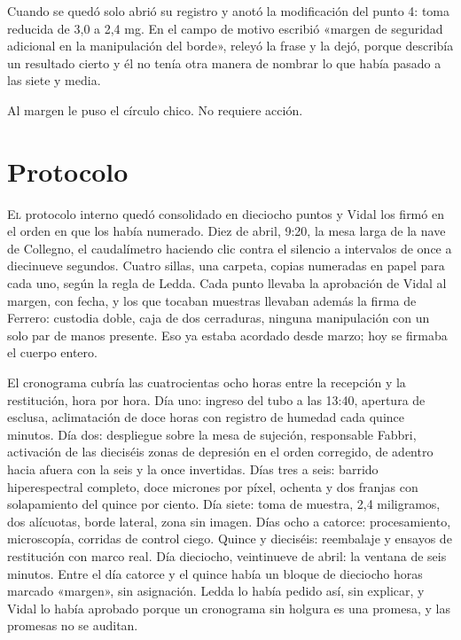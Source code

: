 Cuando se quedó solo abrió su registro y anotó la modificación del punto 4: toma reducida de 3,0 a 2,4 mg. En el campo de motivo escribió «margen de seguridad adicional en la manipulación del borde», releyó la frase y la dejó, porque describía un resultado cierto y él no tenía otra manera de nombrar lo que había pasado a las siete y media.

Al margen le puso el círculo chico. No requiere acción.

\clearpage

\chapter{Protocolo}

\lettrine[lines=2, lhang=0.1, nindent=0.2em]{E}{l} protocolo interno quedó consolidado en dieciocho puntos y Vidal los firmó en el orden en que los había numerado. Diez de abril, 9:20, la mesa larga de la nave de Collegno, el caudalímetro haciendo clic contra el silencio a intervalos de once a diecinueve segundos. Cuatro sillas, una carpeta, copias numeradas en papel para cada uno, según la regla de Ledda. Cada punto llevaba la aprobación de Vidal al margen, con fecha, y los que tocaban muestras llevaban además la firma de Ferrero: custodia doble, caja de dos cerraduras, ninguna manipulación con un solo par de manos presente. Eso ya estaba acordado desde marzo; hoy se firmaba el cuerpo entero.


El cronograma cubría las cuatrocientas ocho horas entre la recepción y la restitución, hora por hora. Día uno: ingreso del tubo a las 13:40, apertura de esclusa, aclimatación de doce horas con registro de humedad cada quince minutos. Día dos: despliegue sobre la mesa de sujeción, responsable Fabbri, activación de las dieciséis zonas de depresión en el orden corregido, de adentro hacia afuera con la seis y la once invertidas. Días tres a seis: barrido hiperespectral completo, doce micrones por píxel, ochenta y dos franjas con solapamiento del quince por ciento. Día siete: toma de muestra, 2,4 miligramos, dos alícuotas, borde lateral, zona sin imagen. Días ocho a catorce: procesamiento, microscopía, corridas de control ciego. Quince y dieciséis: reembalaje y ensayos de restitución con marco real. Día dieciocho, veintinueve de abril: la ventana de seis minutos. Entre el día catorce y el quince había un bloque de dieciocho horas marcado «margen», sin asignación. Ledda lo había pedido así, sin explicar, y Vidal lo había aprobado porque un cronograma sin holgura es una promesa, y las promesas no se auditan.


